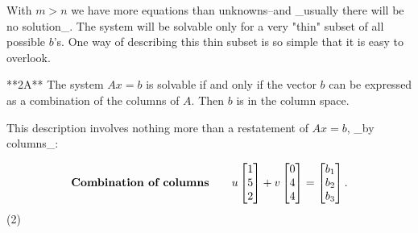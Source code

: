 With \(m>n\) we have more equations than unknowns--and _usually there will be no solution_. The system will be solvable only for a very "thin" subset of all possible \(b\)'s. One way of describing this thin subset is so simple that it is easy to overlook.

**2A** The system \(Ax=b\) is solvable if and only if the vector \(b\) can be expressed as a combination of the columns of \(A\). Then \(b\) is in the column space.

This description involves nothing more than a restatement of \(Ax=b\), _by columns_:

\[\text{\bf Combination of columns}\qquad u\begin{bmatrix}1\\ 5\\ 2\end{bmatrix}+v\begin{bmatrix}0\\ 4\\ 4\end{bmatrix}=\begin{bmatrix}b_{1}\\ b_{2}\\ b_{3}\end{bmatrix}.\] (2) 